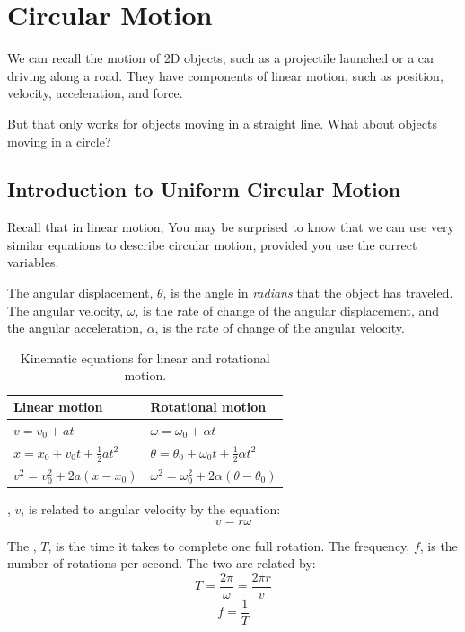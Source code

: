 \chapter{Circular Motion}\label{chap:circular_1}
We can recall the motion of 2D objects, such as a projectile launched or a car driving along a road. They have components of linear motion, such as position, velocity, acceleration, and force.

But that only works for objects moving in a straight line. What about objects moving in a circle?
\section{Introduction to Uniform Circular Motion}
Recall that in linear motion, You may be surprised to know that we can use very similar equations to describe circular motion, provided you use the correct variables.

The angular displacement, $\theta$, is the angle in \emph{radians} that the object has traveled. The angular velocity, $\omega$, is the rate of change of the angular displacement, and the angular acceleration, $\alpha$, is the rate of change of the angular velocity.


\begin{table}[H]
  \centering
  \begin{tabular}{l l}
    Linear motion                          & Rotational motion                                          \\ \hline
    $v = v_0 + a t$                        & $\omega = \omega_0 + \alpha t$                             \\[4pt]
    $x = x_0 + v_0 t + \tfrac{1}{2} a t^2$ & $\theta = \theta_0 + \omega_0 t + \tfrac{1}{2} \alpha t^2$ \\[4pt]
    $v^2 = v_0^2 + 2a(x - x_0)$            & $\omega^2 = \omega_0^2 + 2\alpha(\theta - \theta_0)$
  \end{tabular}
  \caption{Kinematic equations for linear and rotational motion.}
  \label{tab:kinematics_eqs}
\end{table}

, $v$, is related to angular velocity by the equation:
$$v = r \omega$$

The , $T$, is the time it takes to complete one full rotation. The frequency, $f$, is the number of rotations per second. The two are related by:
$$T = \frac{2\pi}{\omega} = \frac{2\pi r}{v}$$
$$f = \frac{1}{T}$$

